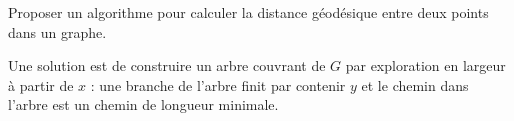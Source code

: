 \begin{exo}
Proposer un algorithme pour calculer la distance géodésique entre deux points dans un graphe.
\begin{sol}
Une solution est de construire un arbre couvrant de $G$ par exploration en largeur à partir de $x$ : une branche de l'arbre finit par contenir $y$ et le chemin dans l'arbre est un chemin de longueur minimale.
\end{sol}
\end{exo}













